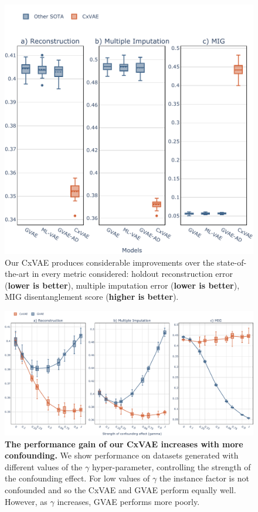 \documentclass[nohyperref]{article}
\theoremstyle{plain}
\theoremstyle{definition}
\theoremstyle{remark}
\begin{document}
\begin{figure}[t]
\vskip 0.2in
\begin{center}
\centerline{\includegraphics[width=\columnwidth]{files/results.pdf}}
\caption{Our CxVAE produces considerable improvements over the state-of-the-art in every metric considered: holdout reconstruction error (\textbf{lower is better}), multiple imputation error (\textbf{lower is better}), MIG disentanglement score (\textbf{higher is better}).}
\label{fig:results}
\end{center}
\vskip -0.2in
\end{figure}

\begin{figure}[t]
\vskip 0.2in
\begin{center}
\centerline{\includegraphics[width=\textwidth]{files/xy_ratio.pdf}}
\caption{\textbf{The performance gain of our CxVAE increases with more confounding.} We show performance on datasets generated with different values of the $\gamma$ hyper-parameter, controlling the strength of the confounding effect. For low values of $\gamma$ the instance factor is not confounded and so the CxVAE and GVAE perform equally well. However, as $\gamma$ increases, GVAE performs more poorly.}
\label{fig:xy}
\end{center}
\vskip -0.2in
\end{figure}
\end{document}
